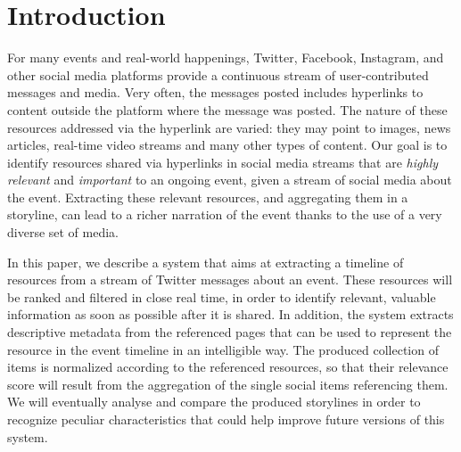 \documentclass{sig-alternate}
\begin{document}


\section{Introduction}
\label{sec:introduction}



For many events and real-world happenings, Twitter, Facebook, Instagram, and other social media platforms provide a continuous stream of user-contributed messages and media. Very often, the messages posted includes hyperlinks to content outside the platform where the message was posted. The nature of these resources addressed via the hyperlink are varied: they may point to images, news articles, real-time video streams and many other types of content. Our goal is to identify resources shared via hyperlinks in social media streams that are \emph{highly relevant} and \emph{important} to an ongoing event, given a stream of social media about the event. Extracting these relevant resources, and aggregating them in a storyline, can lead to a richer narration of the event thanks to the use of a very diverse set of media.

In this paper, we describe a system that aims at extracting a timeline of resources from a stream of Twitter messages about an event. These resources will be ranked and filtered in close real time, in order to identify relevant, valuable information as soon as possible after it is shared. In addition, the system extracts descriptive metadata from the referenced pages that can be used to represent the resource in the event timeline in an intelligible way.  The produced collection of items is normalized according to the referenced resources, so that their relevance score will result from the aggregation of the single social items referencing them. We will eventually analyse and compare the produced storylines in order to recognize peculiar characteristics that could help improve future versions of this system.
\end{document}

